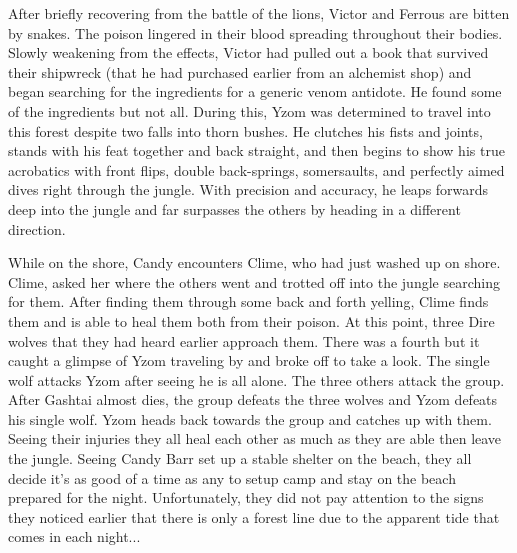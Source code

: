 After briefly recovering from the battle of the lions, Victor and Ferrous are bitten by snakes. The poison lingered in their blood spreading throughout their bodies. Slowly weakening from the effects, Victor had pulled out a book that survived their shipwreck (that he had purchased earlier from an alchemist shop) and began searching for the ingredients for a generic venom antidote. He found some of the ingredients but not all. During this, Yzom was determined to travel into this forest despite two falls into thorn bushes. He clutches his fists and joints, stands with his feat together and back straight, and then begins to show his true acrobatics with front flips, double back-springs, somersaults, and perfectly aimed dives right through the jungle. With precision and accuracy, he leaps forwards deep into the jungle and far surpasses the others by heading in a different direction.

While on the shore, Candy encounters Clime, who had just washed up on shore. Clime, asked her where the others went and trotted off into the jungle searching for them. After finding them through some back and forth yelling, Clime finds them and is able to heal them both from their poison. At this point, three Dire wolves that they had heard earlier approach them. There was a fourth but it caught a glimpse of Yzom traveling by and broke off to take a look. The single wolf attacks Yzom after seeing he is all alone. The three others attack the group. After Gashtai almost dies, the group defeats the three wolves and Yzom defeats his single wolf. Yzom heads back towards the group and catches up with them. Seeing their injuries they all heal each other as much as they are able then leave the jungle. Seeing Candy Barr set up a stable shelter on the beach, they all decide it's as good of a time as any to setup camp and stay on the beach prepared for the night. Unfortunately, they did not pay attention to the signs they noticed earlier that there is only a forest line due to the apparent tide that comes in each night...

